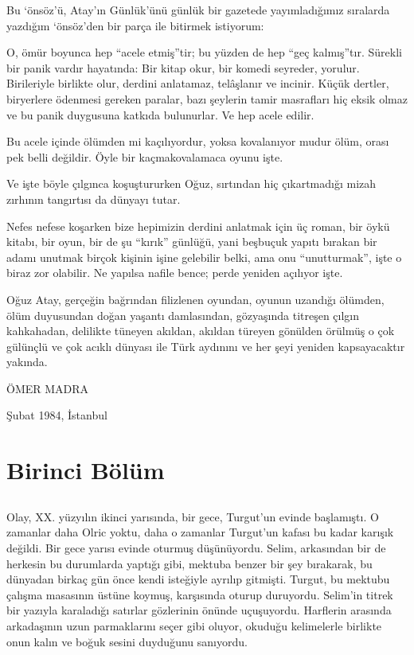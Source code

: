 \documentclass[a5paper,12pt]{scrbook}
\begin{document}
Bu `önsöz'ü, Atay'ın Günlük'ünü günlük bir gazetede yayımladığımız sıralarda
yazdığım `önsöz'den bir parça ile bitirmek istiyorum:

O, ömür boyunca hep ``acele etmiş''tir; bu yüzden de hep ``geç kalmış''tır. Sürekli
bir panik vardır hayatında: Bir kitap okur, bir komedi seyreder, yorulur.
Birileriyle birlikte olur, derdini anlatamaz, telâşlanır ve incinir. Küçük
dertler, biryerlere ödenmesi gereken paralar, bazı şeylerin tamir masrafları hiç
eksik olmaz ve bu panik duygusuna katkıda bulunurlar. Ve hep acele edilir.

Bu acele içinde ölümden mi kaçılıyordur, yoksa kovalanıyor mudur ölüm, orası pek
belli değildir. Öyle bir kaçmakovalamaca oyunu işte.

Ve işte böyle çılgınca koşuştururken Oğuz, sırtından hiç çıkartmadığı mizah
zırhının tangırtısı da dünyayı tutar.

Nefes nefese koşarken bize hepimizin derdini anlatmak için üç roman, bir öykü
kitabı, bir oyun, bir de şu ``kırık'' günlüğü, yani beşbuçuk yapıtı bırakan bir
adamı unutmak birçok kişinin işine gelebilir belki, ama onu ``unutturmak'', işte o
biraz zor olabilir. Ne yapılsa nafile bence; perde yeniden açılıyor işte.

Oğuz Atay, gerçeğin bağrından filizlenen oyundan, oyunun uzandığı ölümden, ölüm
duyusundan doğan yaşantı damlasından, gözyaşında titreşen çılgın kahkahadan,
delilikte tüneyen akıldan, akıldan türeyen gönülden örülmüş o çok gülünçlü ve
çok acıklı dünyası ile Türk aydınını ve her şeyi yeniden kapsayacaktır yakında.

\begin{flushright}
  ÖMER MADRA

  Şubat 1984, İstanbul
\end{flushright}


\part*{Birinci Bölüm}

\chapter{}


Olay, XX. yüzyılın ikinci yarısında, bir gece, Turgut'un evinde başlamıştı. O
zamanlar daha Olric yoktu, daha o zamanlar Turgut'un kafası bu kadar karışık
değildi. Bir gece yarısı evinde oturmuş düşünüyordu. Selim, arkasından bir de
herkesin bu durumlarda yaptığı gibi, mektuba benzer bir şey bırakarak, bu
dünyadan birkaç gün önce kendi isteğiyle ayrılıp gitmişti. Turgut, bu mektubu
çalışma masasının üstüne koymuş, karşısında oturup duruyordu. Selim'in titrek
bir yazıyla karaladığı satırlar gözlerinin önünde uçuşuyordu. Harflerin arasında
arkadaşının uzun parmaklarını seçer gibi oluyor, okuduğu kelimelerle birlikte
onun kalın ve boğuk sesini duyduğunu sanıyordu.
\end{document}
